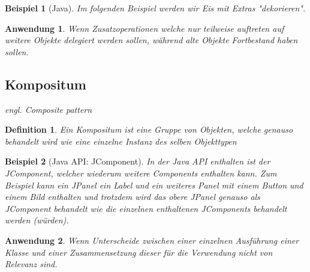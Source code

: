 \documentclass[a4paper]{article}
\theoremstyle{break}
\newtheorem{defi}{Definition}[section]
\newtheorem{ex}{Beispiel}[section]
\newtheorem{why}{Anwendung}[section]
\begin{document}
\begin{ex}[Java]
	Im folgenden Beispiel werden wir Eis mit Extras "dekorieren".
	
	
	
	
	
	
	
	
	
\end{ex}

\begin{why}
	Wenn Zusatzoperationen welche nur teilweise auftreten auf weitere Objekte delegiert werden sollen, während alte Objekte Fortbestand haben sollen.
\end{why}


\newpage
\subsection{Kompositum}

\textit{engl. Composite pattern}

\begin{defi}
	Ein Kompositum ist eine Gruppe von Objekten, welche genauso behandelt wird wie eine einzelne Instanz des selben Objekttypen
\end{defi}

\begin{ex}[Java API: JComponent]
	In der Java API enthalten ist der JComponent, welcher wiederum weitere Components enthalten kann.
	Zum Beispiel kann ein JPanel ein Label und ein weiteres Panel mit einem Button und einem Bild enthalten und trotzdem wird das obere JPanel genauso als JComponent behandelt wie die einzelnen enthaltenen JComponents behandelt werden (würden).
\end{ex}

\begin{why}
	Wenn Unterscheide zwischen einer einzelnen Ausführung einer Klasse und einer Zusammensetzung dieser für die Verwendung nicht von Relevanz sind.
\end{why}
\end{document}
